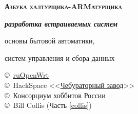 \begin{titlepage}
\vspace{1.5cm}

\begin{centering}

{\Huge \textbf{\textsc{Азбука халтурщика-ARMатурщика \bigskip}}}

{\Huge \textbf{\textit{разработка встраиваемых систем}}}

{\Large 
основы бытовой автоматики,

систем управления и сбора данных
}

\end{centering}

\vspace{1cm}

{\large
\noindent
\copyright\
\href{https://groups.google.com/forum/\#!forum/openwrt2ru}{ruOpenWrt}
 \\
\copyright\
HackSpace
<<\href{https://github.com/ponyatov/CHBZ/raw/master/presentation.pdf}{Чебураторный
завод}>> \\
\copyright\
Консорциум хоббитов России \\
\copyright\ Bill Collis (Часть \ref{collis})
}
\end{titlepage}
